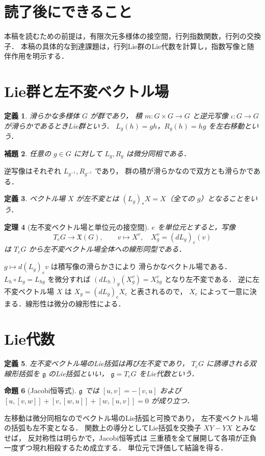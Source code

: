 \documentclass[a5paper,10pt,onecolumn]{jsarticle}
\makeatletter
\theoremstyle{mathnotetheorem}
\newtheorem{theorem}{定理}[section]
\newtheorem{definition}[theorem]{定義}
\newtheorem{lemma}[theorem]{補題}
\newtheorem{proposition}[theorem]{命題}
\renewcommand{\proofname}{証明}
\renewenvironment{proof}[1][\proofname]{%
  \par\pushQED{\qed}\normalfont\topsep4\p@\@plus2\p@\relax
  \trivlist\item[\hskip\labelsep\bfseries #1]\ignorespaces
}{\popQED\endtrivlist\@endpefalse}
\makeatother
\begin{document}
\section*{読了後にできること}
本稿を読むための前提は，有限次元多様体の接空間，行列指数関数，行列の交換子．
本稿の具体的な到達課題は，行列Lie群のLie代数を計算し，指数写像と随伴作用を明示する．


\section{Lie群と左不変ベクトル場}
\begin{definition}
滑らかな多様体 $G$ が群であり，
積 $m:G\times G\to G$ と逆元写像
$\iota:G\to G$ が滑らかであるときLie群という．
$L_g(h)=gh$，$R_g(h)=hg$ を左右移動という．
\end{definition}
\begin{lemma}
任意の $g\in G$ に対して $L_g,R_g$ は微分同相である．
\end{lemma}
\begin{proof}
逆写像はそれぞれ $L_{g^{-1}},R_{g^{-1}}$ であり，
群の積が滑らかなので双方とも滑らかである．
\end{proof}
\begin{definition}
ベクトル場 $X$ が左不変とは
$(L_g)_*X=X$（全ての $g$）となることをいう．
\end{definition}
\begin{theorem}[左不変ベクトル場と単位元の接空間]\label{thm:leftinv}
$e$ を単位元とすると，写像
\[
 T_eG\longrightarrow\mathfrak X(G),\qquad
 v\longmapsto X^v,\quad X^v_g=(dL_g)_e(v)
\]
は $T_eG$ から左不変ベクトル場全体への線形同型である．
\end{theorem}
\begin{proof}
$g\mapsto d(L_g)_ev$ は積写像の滑らかさにより
滑らかなベクトル場である．
$L_h\circ L_g=L_{hg}$ を微分すれば
$(dL_h)_g(X^v_g)=X^v_{hg}$ となり左不変である．
逆に左不変ベクトル場 $X$ は
$X_g=(dL_g)_eX_e$ と表されるので，
$X_e$ によって一意に決まる．線形性は微分の線形性による．
\end{proof}
\section{Lie代数}
\begin{definition}
左不変ベクトル場のLie括弧は再び左不変であり，
$T_eG$ に誘導される双線形括弧を
$\mathfrak g$ のLie括弧といい，
$\mathfrak g=T_eG$ をLie代数という．
\end{definition}
\begin{proposition}[Jacobi恒等式]
$\mathfrak g$ では
$[u,v]=-[v,u]$ および
$[u,[v,w]]+[v,[w,u]]+[w,[u,v]]=0$ が成り立つ．
\end{proposition}
\begin{proof}
左移動は微分同相なのでベクトル場のLie括弧と可換であり，
左不変ベクトル場の括弧も左不変となる．
関数上の導分としてLie括弧を交換子 $XY-YX$ とみなせば，
反対称性は明らかで，Jacobi恒等式は
三重積を全て展開して各項が正負一度ずつ現れ相殺するため成立する．
単位元で評価して結論を得る．
\end{proof}
\end{document}
